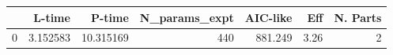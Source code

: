 \begin{tabular}{lrrrrrr}
\toprule
{} &    L-time &     P-time &  N\_params\_expt &  AIC-like &   Eff &  N. Parts \\
\midrule
0 &  3.152583 &  10.315169 &            440 &   881.249 &  3.26 &         2 \\
\bottomrule
\end{tabular}
